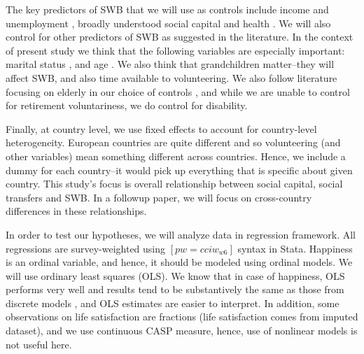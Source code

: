 \documentclass[10pt, letterpaper]{article}
\begin{document}
\begin{spacing}{1.4}
The key predictors of SWB that we will use as controls include income and
unemployment \citep[][]{ditella01moa,ditella01mob,ditella06m}, broadly
understood social
capital and health \citep{blanchflower11,dolan08al,bonsang12}. %
We will also control for other predictors of SWB as suggested in the 
literature. In the context of present study we think that the following
variables are especially important: marital status
\citep[e.g.,][]{myers00,diener04s}, and age \citep{ferring10}. We also think
that grandchildren matter--they will affect SWB, and also time available to volunteering.
%
We also follow literature focusing on elderly in our choice of controls
\citep[e.g.,][]{meier2008volunteering,bonsang12,bender12,ferring10}, and while
we are unable to control for retirement voluntariness, we do control for
disability.

Finally, at country level, we use fixed effects to account for country-level
heterogeneity.
European countries are quite different and so volunteering (and other variables) mean something
different across countries.  Hence, we include a dummy for each country--it would pick up
everything that is specific about given country. This study's focus is overall
relationship between social capital, social transfers and SWB. In a followup
paper, we will focus on cross-country differences in these relationships. 


In order to test our hypotheses, we will analyze data in regression framework. 
 All regressions are survey-weighted using $[pw=cciw_{w6}]$ syntax in Stata.
Happiness is an ordinal variable, and hence, it should be modeled using ordinal
models. We will use ordinary least squares (OLS). We know that
in case of happiness, OLS performs very well and results tend to be substantively
the same as those from discrete models \citep{carbonell04,blanchflower11}, and
OLS estimates are easier to interpret.  In addition, some observations on life
satisfaction are fractions (life satisfaction comes from imputed dataset), and
we use continuous CASP measure, hence, use of nonlinear models is not useful
here. 



\end{spacing}
\end{document}
